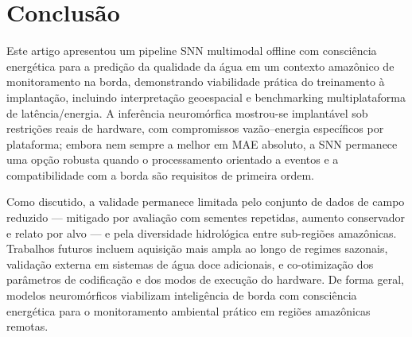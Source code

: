 \section{Conclusão}

Este artigo apresentou um pipeline SNN multimodal offline com consciência energética para a predição da qualidade da água em um contexto amazônico de monitoramento na borda, demonstrando viabilidade prática do treinamento à implantação, incluindo interpretação geoespacial e benchmarking multiplataforma de latência/energia. A inferência neuromórfica mostrou-se implantável sob restrições reais de hardware, com compromissos vazão--energia específicos por plataforma; embora nem sempre a melhor em MAE absoluto, a SNN permanece uma opção robusta quando o processamento orientado a eventos e a compatibilidade com a borda são requisitos de primeira ordem.

Como discutido, a validade permanece limitada pelo conjunto de dados de campo reduzido --- mitigado por avaliação com sementes repetidas, aumento conservador e relato por alvo --- e pela diversidade hidrológica entre sub-regiões amazônicas. Trabalhos futuros incluem aquisição mais ampla ao longo de regimes sazonais, validação externa em sistemas de água doce  adicionais, e co-otimização dos parâmetros de codificação e dos modos de execução do hardware.  De forma geral, modelos neuromórficos viabilizam inteligência de borda com consciência energética para o monitoramento ambiental prático em regiões amazônicas remotas.
